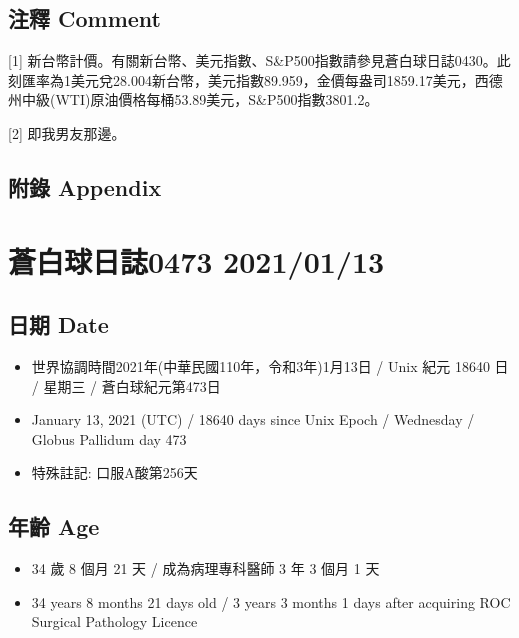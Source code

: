 \documentclass[a5paper, 11pt
]{book}
\providecommand{\tightlist}{%
  \setlength{\itemsep}{0pt}\setlength{\parskip}{0pt}}
\begin{document}
\hypertarget{ux6ce8ux91cb-comment-42}{%
\subsection{注釋 Comment}\label{ux6ce8ux91cb-comment-42}}

{[}1{]}
新台幣計價。有關新台幣、美元指數、S\&P500指數請參見蒼白球日誌0430。此刻匯率為1美元兌28.004新台幣，美元指數89.959，金價每盎司1859.17美元，西德州中級(WTI)原油價格每桶53.89美元，S\&P500指數3801.2。

{[}2{]} 即我男友那邊。

\hypertarget{ux9644ux9304-appendix-42}{%
\subsection{附錄 Appendix}\label{ux9644ux9304-appendix-42}}

\hypertarget{ux84bcux767dux7403ux65e5ux8a8c0473-20210113}{%
\section{蒼白球日誌0473
2021/01/13}\label{ux84bcux767dux7403ux65e5ux8a8c0473-20210113}}

\hypertarget{ux65e5ux671f-date-43}{%
\subsection{日期 Date}\label{ux65e5ux671f-date-43}}

\begin{itemize}
\tightlist
\item
  世界協調時間2021年(中華民國110年，令和3年)1月13日 / Unix 紀元 18640 日
  / 星期三 / 蒼白球紀元第473日
\item
  January 13, 2021 (UTC) / 18640 days since Unix Epoch / Wednesday /
  Globus Pallidum day 473
\item
  特殊註記: 口服A酸第256天
\end{itemize}

\hypertarget{ux5e74ux9f61-age-43}{%
\subsection{年齡 Age}\label{ux5e74ux9f61-age-43}}

\begin{itemize}
\tightlist
\item
  34 歲 8 個月 21 天 / 成為病理專科醫師 3 年 3 個月 1 天
\item
  34 years 8 months 21 days old / 3 years 3 months 1 days after
  acquiring ROC Surgical Pathology Licence
\end{itemize}
\end{document}
